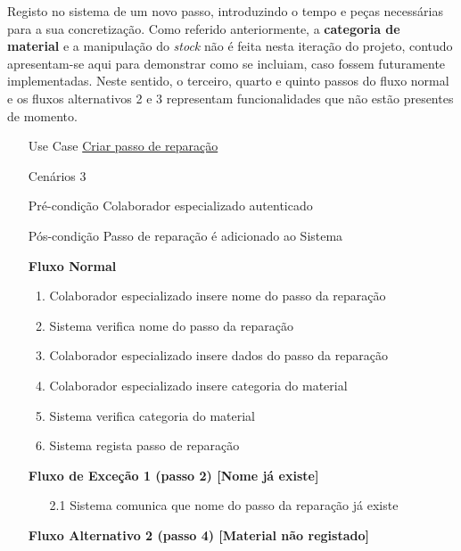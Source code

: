 \documentclass[../relatorio.tex]{subfiles}
\begin{document}
Registo no sistema de um novo passo, introduzindo o tempo e peças necessárias para a sua concretização.
Como referido anteriormente, a \textbf{categoria de material} e a manipulação do \textit{stock} não é feita
nesta iteração do projeto, contudo apresentam-se aqui para demonstrar como se incluiam, caso fossem futuramente
implementadas.
Neste sentido, o terceiro, quarto e quinto passos do fluxo normal e os fluxos alternativos 2 e 3 representam
funcionalidades que não estão presentes de momento.
\begin{itemize}
    \item[Use Case] {\underline{Criar passo de reparação}}
    \item[Cenários] {3}
    \item[Pré-condição] {Colaborador especializado autenticado}
    \item[Pós-condição] {Passo de reparação é adicionado ao Sistema}
          \begin{flushleft}
              \textbf{Fluxo Normal}
          \end{flushleft}
          \begin{enumerate}
              \item Colaborador especializado insere nome do passo da reparação
              \item Sistema verifica nome do passo da reparação
              \item Colaborador especializado insere dados do passo da reparação
              \item Colaborador especializado insere categoria do material
              \item Sistema verifica categoria do material
              \item Sistema regista passo de reparação
          \end{enumerate}
          \begin{flushleft}
            \textbf{Fluxo de Exceção 1 (passo 2) [Nome já existe]}
        \end{flushleft}
        \begin{itemize}
            \item[2.1]  Sistema comunica que nome do passo da reparação já existe
        \end{itemize}
          \begin{flushleft}
		      \textbf{Fluxo Alternativo 2 (passo 4) [Material não registado]}
	      \end{flushleft}
	      \begin{itemize}

\end{itemize}
\end{itemize}
\end{document}
